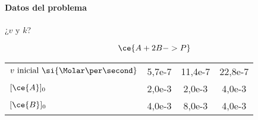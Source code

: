 
\begin{frame}
    \frametitle{\ejerciciocmd}
    \framesubtitle{Datos del problema}
    \begin{center}
        {\Large ¿$v$ y $k$?}
    \end{center}
    $$
        \ce{A + 2B -> P}
    $$
    \begin{center}
        \begin{tabular}{lSSS}
            $v~\text{inicial}~\si{\Molar\per\second}$ &
            5,7e-7 &
            11,4e-7 &
            22,8e-7\\
            $[\ce{A}]_0$ &
            2,0e-3 &
            2,0e-3 &
            4,0e-3 \\
            $[\ce{B}]_0$ &
            4,0e-3 &
            8,0e-3 &
            4,0e-3
        \end{tabular}
    \end{center}
\end{frame}

